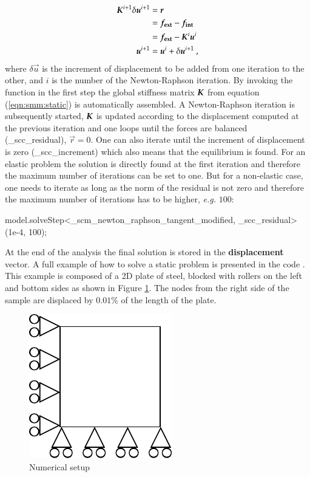 \begin{align}\label{eqn:smm:static-newton-raphson} \boldsymbol{K}^{i+1}
\delta\boldsymbol{u}^{i+1} &= \boldsymbol{r} \\ &= \boldsymbol{f_{{\mathrm{ext}}}} -
\boldsymbol{f_{{\mathrm{int}}}}\\ &= \boldsymbol{f_{{\mathrm{ext}}}} - \boldsymbol{K}^{i} \boldsymbol{u}^{i}\\
\boldsymbol{u}^{i+1} &= \boldsymbol{u}^{i} + \delta\boldsymbol{u}^{i+1}~,\nonumber
\end{align}
where $\delta\vec{ u}$ is the increment of displacement to be added
from one iteration to the other, and $i$ is the number of the
Newton-Raphson iteration.  By invoking the  function
in the first step the global stiffness matrix $\boldsymbol{K}$ from equation
(\ref{eqn:smm:static}) is automatically assembled. A Newton-Raphson
iteration is subsequently started, $\boldsymbol{K}$ is updated according to
the displacement computed at the previous iteration and one loops
until the forces are balanced (\_scc\_residual), \ie $\vec{r} = 0$.
One can also iterate until the increment of displacement is zero
(\_scc\_increment) which also means that the equilibrium is found.
For an elastic problem the solution is directly found at the first
iteration and therefore the maximum number of iterations can be set to
one. But for a non-elastic case, one needs to iterate as long as the
norm of the residual is not zero and therefore the maximum number of
iterations has to be higher, \textit{e.g.} $100$:
\begin{cpp} model.solveStep<_scm_newton_raphson_tangent_modified,
_scc_residual>(1e-4, 100);
\end{cpp} At the end of the analysis the final solution is stored in
the \textbf{displacement} vector.  A full example of how to solve a
static problem is presented in the code
.  This example is composed of a
2D plate of steel, blocked with rollers on the left and bottom sides
as shown in Figure \ref{fig:smm:static}.  The nodes from the right
side of the sample are displaced by $0.01\%$ of the length of the
plate.

\begin{figure}[!htb] \centering
  \includegraphics{figures/static}
  \caption{Numerical setup\label{fig:smm:static}}
\end{figure}

